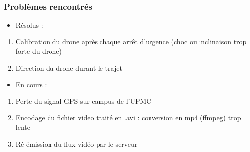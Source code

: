 \documentclass{beamer}
\begin{document}
	
	\begin{frame}
		\begin{center}
		\frametitle{Problèmes rencontrés}
	    \begin{itemize}
                 \item Résolus :
            \end{itemize}
        \begin{enumerate}
             
            \item Calibration du drone après chaque arrêt d'urgence (choc ou inclinaison trop forte du drone)
             \item Direction du drone durant le trajet
             \end{enumerate}
            \begin{itemize}
                \item En cours :
            \end{itemize}
            \begin{enumerate}
           \item Perte du signal GPS sur campus de l'UPMC
           \item Encodage du fichier video traité en .avi : conversion en mp4 (ffmpeg) trop lente
           \item Ré-émission du flux vidéo par le serveur
           \end{enumerate}
		\end{center}
	\end{frame}

	
\end{document}
